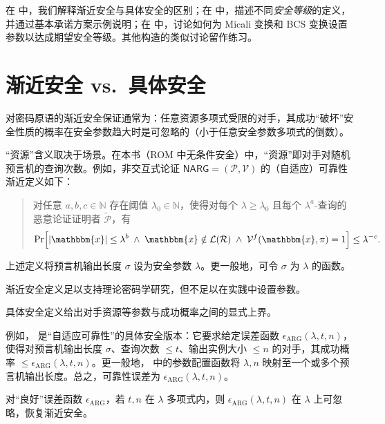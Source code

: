 \documentclass[american,singlepageview]{snargs-book-zh}
\newcommand{\Malicious}[1]{\tilde{#1}}
\newcommand{\SomeSize}[1]{|#1|}
\newcommand{\Naturals}{\mathbb{N}}
\newcommand{\Relation}{\mathcal{R}}
\newcommand{\Language}{\mathcal{L}}
\newcommand{\GetLanguage}[1]{\Language(#1)}
\newcommand{\Instance}{\mathbbm{x}}
\newcommand{\InstanceSize}{n}
\newcommand{\ProtoProver}{P}
\newcommand{\ProtoVerifier}{V}
\newcommand{\ProtoSoundnessError}{\epsilon}
\newcommand{\NARGSymbol}{\mathsf{NARG}}
\newcommand{\ARGSubscript}{\scriptscriptstyle\mathrm{ARG}}
\newcommand{\ARGFormat}[1]{\mathcal{#1}}
\newcommand{\ARGProver}{\ARGFormat{\ProtoProver}}
\newcommand{\ARGVerifier}{\ARGFormat{\ProtoVerifier}}
\newcommand{\ARGSystem}{(\ARGProver,\ARGVerifier)}
\newcommand{\ARGString}{\pi}
\newcommand{\ARGSoundnessError}{\ProtoSoundnessError_{\ARGSubscript}}
\newcommand{\ROFunction}{f}
\newcommand{\ROQueryBound}{t}
\newcommand{\SecurityParameter}{\lambda}
\newcommand{\ROOutputSize}{\sigma}
\begin{document}
在  中，我们解释渐近安全与具体安全的区别；在  中，描述不同\emph{安全等级}的定义，并通过基本承诺方案示例说明；在  中，讨论如何为 Micali 变换和 BCS 变换设置参数以达成期望安全等级。其他构造的类似讨论留作练习。

\section{渐近安全 vs.\ 具体安全}
\label{section:asymptotic-vs-concrete-security}

对密码原语的渐近安全保证通常为：任意资源多项式受限的对手，其成功“破坏”安全性质的概率在安全参数趋大时是可忽略的（小于任意安全参数多项式的倒数）。

“资源”含义取决于场景。在本书（ROM 中无条件安全）中，“资源”即对手对随机预言机的查询次数。例如，非交互式论证 $\NARGSymbol=\ARGSystem$ 的（自适应）可靠性渐近定义如下：
\begin{quote}
对任意 $a,b,c\in\Naturals$ 存在阈值 $\SecurityParameter_0\in\Naturals$，使得对每个 $\SecurityParameter\ge \SecurityParameter_0$ 且每个 $\SecurityParameter^a$-查询的恶意论证证明者 $\Malicious{\ARGProver}$，有
\[
\Pr\Bigl[
\SomeSize{\Instance}\le\SecurityParameter^b
\;\land\;\Instance\notin\GetLanguage{\Relation}
\;\land\;\ARGVerifier^{\ROFunction}(\Instance,\ARGString)=1
\Bigr]
\le \SecurityParameter^{-c}.
\]
\end{quote}
上述定义将预言机输出长度 $\ROOutputSize$ 设为安全参数 $\SecurityParameter$。更一般地，可令 $\ROOutputSize$ 为 $\SecurityParameter$ 的函数。

渐近安全定义足以支持理论密码学研究，但不足以在实践中设置参数。

具体安全定义给出对手资源等参数与成功概率之间的显式上界。

例如， 是“自适应可靠性”的具体安全版本：它要求给定误差函数 $\ARGSoundnessError(\SecurityParameter,\ROQueryBound,\InstanceSize)$，使得对预言机输出长度 $\ROOutputSize$、查询次数 $\le \ROQueryBound$、输出实例大小 $\le\InstanceSize$ 的对手，其成功概率 $\le\ARGSoundnessError(\SecurityParameter,\ROQueryBound,\InstanceSize)$。更一般地， 中的参数配置函数将 $\SecurityParameter,\InstanceSize$ 映射至一个或多个预言机输出长度。总之，可靠性误差为 $\ARGSoundnessError(\SecurityParameter,\ROQueryBound,\InstanceSize)$。

对“良好”误差函数 $\ARGSoundnessError$，若 $\ROQueryBound,\InstanceSize$ 在 $\SecurityParameter$ 多项式内，则 $\ARGSoundnessError(\SecurityParameter,\ROQueryBound,\InstanceSize)$ 在 $\SecurityParameter$ 上可忽略，恢复渐近安全。
\end{document}
